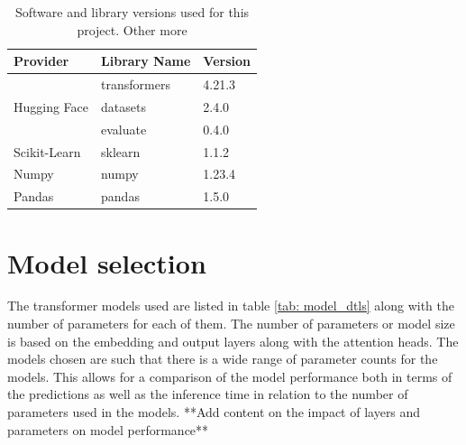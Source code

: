 \begin{table}[ht]
    \captionsetup{font=small}
    \centering
    \begin{tabularx}{\textwidth}{|X|X|X|}
        \hline
        \rowcolor[gray]{0.7}
        \multirow{-3}{*}{} \textbf{Provider} & \textbf{Library Name} & \textbf{Version} \\
        \hline
        \multirow{3}{*}{Hugging Face}        & transformers          & 4.21.3           \\
        \cline{2-3}
                                             & datasets              & 2.4.0            \\
        \cline{2-3}
                                             & evaluate              & 0.4.0            \\
        \hline
        Scikit-Learn                         & sklearn               & 1.1.2            \\
        \hline
        Numpy                                & numpy                 & 1.23.4           \\
        \hline
        Pandas                               & pandas                & 1.5.0            \\
        \hline
    \end{tabularx}
    \caption{Software and library versions used for this project. Other more }
    \label{tab: libs_used}
\end{table}

\section{Model selection}
The transformer models used are listed in table \ref{tab: model_dtls} along with the number of parameters for each of them. The number of parameters or model size is based on the embedding and output layers along with the attention heads. The models chosen are such that there is a wide range of parameter counts for the models. This allows for a comparison of the model performance both in terms of the predictions as well as the inference time in relation to the number of parameters used in the models. **Add content on the impact of layers and parameters on model performance**

